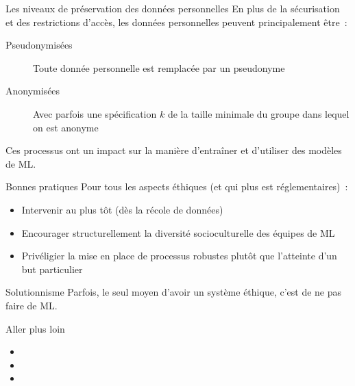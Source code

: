 \begin{frame}{Les niveaux de préservation des données personnelles}
  En plus de la sécurisation et des restrictions d'accès, les données personnelles peuvent principalement être~:
  \begin{description}
    \item[Pseudonymisées] Toute donnée personnelle est remplacée par un pseudonyme
    \item[Anonymisées] Avec parfois une spécification $k$ de la taille minimale du groupe dans lequel on est anonyme
  \end{description}

  Ces processus ont un impact sur la manière d'entraîner et d'utiliser des modèles de ML.
\end{frame}

\begin{frame}{Bonnes pratiques}
  Pour tous les aspects éthiques (et qui plus est réglementaires)~:

  \begin{itemize}
    \item Intervenir au plus tôt (dès la récole de données)
    \item Encourager structurellement la diversité socioculturelle des équipes de ML
    \item Privéligier la mise en place de processus robustes plutôt que l'atteinte d'un but particulier
  \end{itemize}
\end{frame}

\begin{frame}{Solutionnisme}
  Parfois, le seul moyen d'avoir un système éthique, c'est de \alert{ne pas} faire de ML.
\end{frame}

\begin{frame}{Aller plus loin}
  \begin{itemize}
    \item {}
    \item {}
    \item {}
  \end{itemize}
\end{frame}
